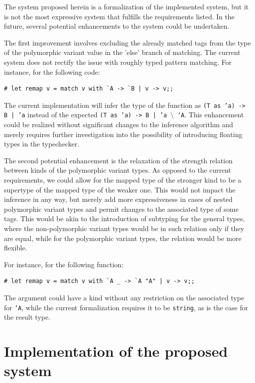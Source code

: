 \documentclass[a4paper,11pt,oneside]{article}
\theoremstyle{definition}
\begin{document}
The system proposed herein is a formalization of the implemented system, but it is not the most expressive system that fulfills the requirements listed. In the future, several potential enhancements to the system could be undertaken.

The first improvement involves excluding the already matched tags from the type of the polymorphic variant value in the 'else' branch of matching. The current system does not rectify the issue with roughly typed pattern matching. For instance, for the following code:

{\ttfamily\begin{verbatim}
# let remap v = match v with `A -> `B | v -> v;;
\end{verbatim}}

The current implementation will infer the type of the function as \texttt{(T as 'a) -> B | 'a} instead of the expected \texttt{(T as 'a) -> B | 'a $\setminus$ `A}. This enhancement could be realized without significant changes to the inference algorithm and merely requires further investigation into the possibility of introducing floating types in the typechecker.

The second potential enhancement is the relaxation of the strength relation between kinds of the polymorphic variant types. As opposed to the current requirements, we could allow for the mapped type of the stronger kind to be a supertype of the mapped type of the weaker one. This would not impact the inference in any way, but merely add more expressiveness in cases of nested polymorphic variant types and permit changes to the associated type of some tags. This would be akin to the introduction of subtyping for the general types, where the non-polymorphic variant types would be in such relation only if they are equal, while for the polymorphic variant types, the relation would be more flexible.

For instance, for the following function:

{\ttfamily\begin{verbatim}
# let remap v = match v with `A _ -> `A "A" | v -> v;;
\end{verbatim}}

The argument could have a kind without any restriction on the associated type for \texttt{`A}, while the current formalization requires it to be \texttt{string}, as is the case for the result type.

\section{Implementation of the proposed system}
\end{document}
